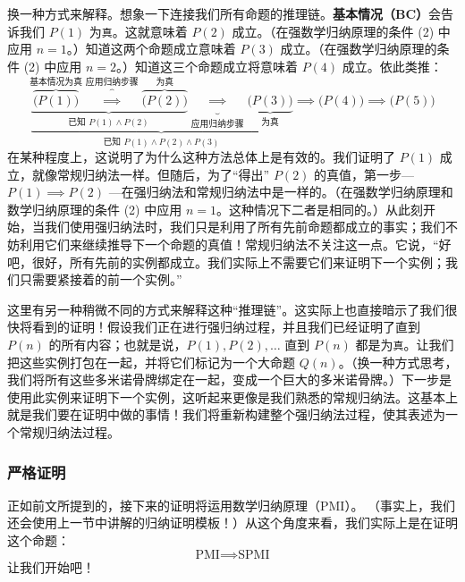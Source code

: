 换一种方式来解释。想象一下连接我们所有命题的推理链。\textbf{基本情况（BC）}会告诉我们 $P(1)$ 为\verb|真|。这就意味着 $P(2)$ 成立。（在强数学归纳原理的条件 (2) 中应用 $n = 1$。）知道这两个命题成立意味着 $P(3)$ 成立。（在强数学归纳原理的条件 (2) 中应用 $n=2$。）知道这三个命题成立将意味着 $P(4)$ 成立。依此类推：
\[\underbrace{\underbrace{\overbrace{\Big(P(1)\Big)}^{\text{基本情况为真}} \overbrace{\implies}^{\text{应用归纳步骤}} \overbrace{\Big(P(2)\Big)}^{\text{为真}}}_{\text{已知 } P(1) \land P(2)} \underbrace{\implies}_{\text{应用归纳步骤}} \underbrace{\Big(P(3)\Big)}_{\text{为真}}}_{\text{已知 } P(1) \land P(2) \land P(3)} \implies\Big(P(4)\Big) \implies \Big(P(5)\Big)\]
在某种程度上，这说明了为什么这种方法总体上是有效的。我们证明了 $P(1)$ 成立，就像常规归纳法一样。但随后，为了``得出'' $P(2)$ 的真值，第一步--- $P(1) \implies P(2)$ ---在强归纳法和常规归纳法中是一样的。（在强数学归纳原理和数学归纳原理的条件 (2) 中应用 $n = 1$。这种情况下二者是相同的。）从此刻开始，当我们使用强归纳法时，我们只是利用了所有先前命题都成立的事实；我们不妨利用它们来继续推导下一个命题的真值！常规归纳法不关注这一点。它说，``好吧，很好，所有先前的实例都成立。我们实际上不需要它们来证明下一个实例；我们只需要紧接着的前一个实例。''

这里有另一种稍微不同的方式来解释这种``推理链''。这实际上也直接暗示了我们很快将看到的证明！假设我们正在进行强归纳过程，并且我们已经证明了直到 $P(n)$ 的所有内容；也就是说，$P(1), P(2),\dots$ 直到 $P(n)$ 都是为\verb|真|。让我们把这些实例打包在一起，并将它们标记为一个大命题 $Q(n)$。（换一种方式思考，我们将所有这些多米诺骨牌绑定在一起，变成一个巨大的多米诺骨牌。）下一步是使用此实例来证明下一个实例，这听起来更像是我们熟悉的常规归纳法。这基本上就是我们要在证明中做的事情！我们将重新构建整个强归纳法过程，使其表述为一个常规归纳法过程。

\subsubsection*{严格证明}

正如前文所提到的，接下来的证明将运用数学归纳原理（PMI）。 （事实上，我们还会使用上一节中讲解的归纳证明模板！）从这个角度来看，我们实际上是在证明这个命题：
\[\text{PMI} \implies \text{SPMI}\]
让我们开始吧！


